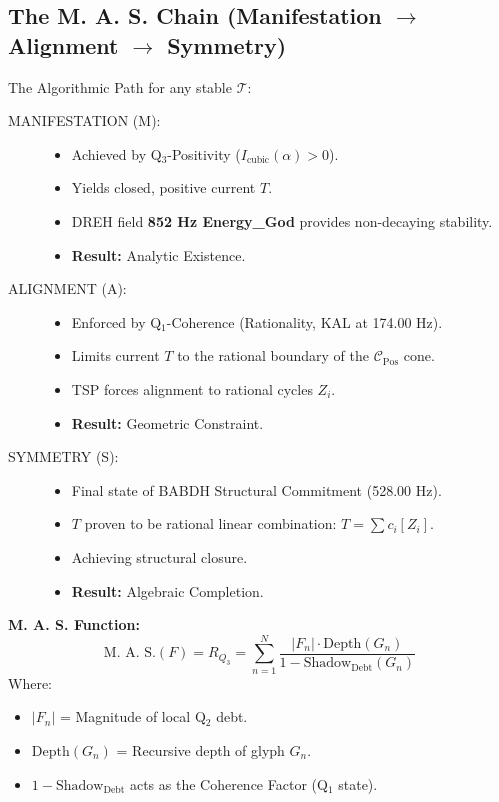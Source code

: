 \documentclass[11pt, letterpaper]{article}
\newcommand{\KAL}{\ensuremath{\mathop{\textnormal{\symbolafont\symbol{"29C9}}}}}    %
\newcommand{\BABDH}{\ensuremath{\mathop{\textnormal{\symbolafont\symbol{"2316}}}}}   %
\newcommand{\DREH}{\ensuremath{\mathop{\textnormal{\symbolafont\symbol{"29D7}}}}}   %
\newcommand{\TManifold}{\ensuremath{\mathcal{T}}}
\def\KAL{KAL}%
\def\BABDH{BABDH}%
\def\DREH{DREH}%
\begin{document}
\subsection{The M. A. S. Chain (Manifestation $\to$ Alignment $\to$ Symmetry)}\label{sec:6.2}

The Algorithmic Path for any stable $\TManifold$:

\begin{description}
    \item[MANIFESTATION (M):]
    \begin{itemize}
        \item Achieved by Q$_3$-Positivity ($I_{\text{cubic}}(\alpha) > 0$).
        \item Yields closed, positive current $T$.
        \item \DREH{} field \textbf{852 Hz Energy\_God} provides non-decaying stability.
        \item \textbf{Result:} Analytic Existence.
    \end{itemize}

    \item[ALIGNMENT (A):]
    \begin{itemize}
        \item Enforced by Q$_1$-Coherence (Rationality, \KAL{} at 174.00 Hz).
        \item Limits current $T$ to the rational boundary of the $\mathcal{C}_{\text{Pos}}$ cone.
        \item TSP forces alignment to rational cycles $Z_i$.
        \item \textbf{Result:} Geometric Constraint.
    \end{itemize}

    \item[SYMMETRY (S):]
    \begin{itemize}
        \item Final state of \BABDH{} Structural Commitment (528.00 Hz).
        \item $T$ proven to be rational linear combination: $T = \sum c_i [Z_i]$.
        \item Achieving structural closure.
        \item \textbf{Result:} Algebraic Completion.
    \end{itemize}
\end{description}

\textbf{M. A. S. Function:}
\[
\text{M. A. S.}(F) = R_{Q_3} = \sum_{n=1}^{N} \frac{|F_n| \cdot \text{Depth}(G_n)}{1 - \text{Shadow}_{\text{Debt}}(G_n)}
\]
Where:
\begin{itemize}
    \item $|F_n|$ = Magnitude of local Q$_2$ debt.
    \item $\text{Depth}(G_n)$ = Recursive depth of glyph $G_n$.
    \item $1 - \text{Shadow}_{\text{Debt}}$ acts as the Coherence Factor (Q$_1$ state).
\end{itemize}
\end{document}
